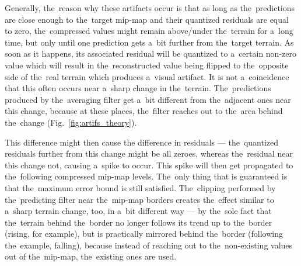 Generally, the~reason why these artifacts occur is that as long as the~predictions are close enough to the~target mip-map and their quantized residuals are equal to zero, the~compressed values might remain above/under the~terrain for a~long time, but only until one prediction gets a~bit further from the~target terrain. As soon as it happens, its associated residual will be quantized to a~certain non-zero value which will result in the~reconstructed value being flipped to the~opposite side of the~real terrain which produces a~visual artifact. It is not a~coincidence that this often occurs near a~sharp change in the~terrain. The~predictions produced by the~averaging filter get a~bit different from the~adjacent ones near this change, because at these places, the~filter reaches out to the~area behind the~change (Fig.~\ref{fig:artifs_theory}). 

This difference might then cause the difference in residuals --- the~quantized residuals further from this change might be all zeroes, whereas the~residual near this change not, causing a~spike to occur. This spike will then get propagated to the~following compressed mip-map levels. The~only thing that is guaranteed is that the~maximum error bound is still satisfied. The~clipping performed by the~predicting filter near the~mip-map borders creates the~effect similar to a~sharp terrain change, too, in a~bit different way --- by the~sole fact that the~terrain behind the~border no longer follows its trend up to the~border (rising, for example), but is practically mirrored behind the~border (following the~example, falling), because instead of reaching out to the~non-existing values out of the~mip-map, the~existing ones are used.

